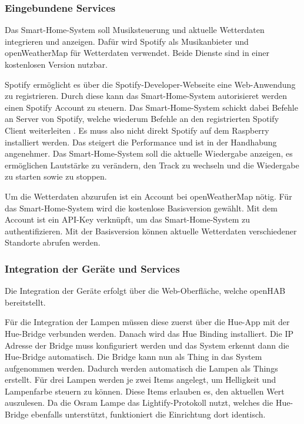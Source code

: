 		\subsubsection{Eingebundene Services}
		Das Smart-Home-System soll Musiksteuerung und aktuelle Wetterdaten  integrieren und anzeigen. Dafür wird Spotify als Musikanbieter und openWeatherMap für Wetterdaten verwendet. Beide Dienste sind in einer kostenlosen Version nutzbar.
		
		Spotify ermöglicht es über die Spotify-Developer-Webseite eine Web-Anwendung zu registrieren. Durch diese kann das Smart-Home-System autorisieret werden einen Spotify Account zu steuern. Das Smart-Home-System schickt dabei Befehle an Server von Spotify, welche wiederum Befehle an den registrierten Spotify Client weiterleiten \cite{DB:spotify}. Es muss also nicht direkt Spotify auf dem Raspberry installiert werden. Das steigert die Performance und ist in der Handhabung angenehmer. Das Smart-Home-System soll die aktuelle Wiedergabe anzeigen, es ermöglichen Lautstärke zu verändern, den Track zu wechseln und die Wiedergabe zu starten sowie zu stoppen.
		
		Um die Wetterdaten abzurufen ist ein Account bei openWeatherMap nötig. Für das Smart-Home-System wird die kostenlose Basisversion gewählt. Mit dem Account ist ein API-Key verknüpft, um das Smart-Home-System zu authentifizieren. Mit der Basisversion können aktuelle Wetterdaten verschiedener Standorte abrufen werden.
		
		\subsubsection{Integration der Geräte und Services}
		Die Integration der Geräte erfolgt über die Web-Oberfläche, welche openHAB bereitstellt. 
		
		Für die Integration der Lampen müssen diese zuerst über die Hue-App mit der Hue-Bridge verbunden werden. Danach wird das Hue Binding installiert. Die IP Adresse der Bridge  muss konfiguriert werden und das System erkennt dann die Hue-Bridge automatisch. Die Bridge kann nun als Thing in das System aufgenommen werden. Dadurch werden automatisch die Lampen als Things erstellt. Für drei Lampen werden je zwei Items angelegt, um Helligkeit und Lampenfarbe steuern zu können. Diese Items erlauben es, den aktuellen Wert auszulesen. Da die Osram Lampe das Lightify-Protokoll nutzt, welches die Hue-Bridge ebenfalls unterstützt, funktioniert die Einrichtung dort identisch.
		
